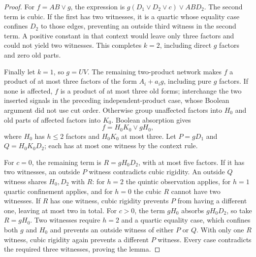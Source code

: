 \documentclass[11pt]{article}
\theoremstyle{definition}
\theoremstyle{remark}
\begin{document}
\begin{proof}
For $f=AB\vee g$, the expression is $g(D_1\vee D_2\vee c)\vee ABD_2$. The second term is cubic. If the first has two witnesses, it is a quartic whose equality case confines $D_2$ to those edges, preventing an outside third witness in the second term. A positive constant in that context would leave only three factors and could not yield two witnesses. This completes $k=2$, including direct $g$ factors and zero old parts.

Finally let $k=1$, so $g=UV$. The remaining two-product network makes $f$ a product of at most three factors of the form $A_i+a_i g$, including pure $g$ factors. If none is affected, $f$ is a product of at most three old forms; interchange the two inserted signals in the preceding independent-product case, whose Boolean argument did not use cut order. Otherwise group unaffected factors into $H_0$ and old parts of affected factors into $K_0$. Boolean absorption gives
\[
 f=H_0K_0\vee gH_0,
\]
where $H_0$ has $h\le2$ factors and $H_0K_0$ at most three. Let $P=gD_1$ and $Q=H_0K_0D_2$; each has at most one witness by the context rule.

For $c=0$, the remaining term is $R=gH_0D_2$, with at most five factors. If it has two witnesses, an outside $P$ witness contradicts cubic rigidity. An outside $Q$ witness shares $H_0,D_2$ with $R$: for $h=2$ the quintic observation applies, for $h=1$ quartic confinement applies, and for $h=0$ the cubic $R$ cannot have two witnesses. If $R$ has one witness, cubic rigidity prevents $P$ from having a different one, leaving at most two in total. For $c>0$, the term $gH_0$ absorbs $gH_0D_2$, so take $R=gH_0$. Two witnesses require $h=2$ and a quartic equality case, which confines both $g$ and $H_0$ and prevents an outside witness of either $P$ or $Q$. With only one $R$ witness, cubic rigidity again prevents a different $P$ witness. Every case contradicts the required three witnesses, proving the lemma.
\end{proof}
\end{document}
